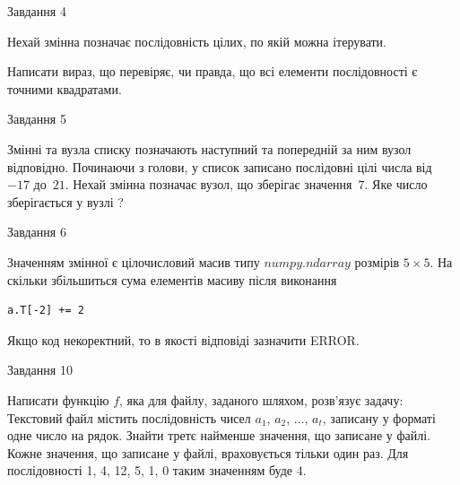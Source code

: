\documentclass[12pt, ukrainian]{article}
\begin{document}
{\begin{minipage}[t]{8.0cm}
\end{minipage}


               
{\begin{center}Завдання {4}\end{center}}
\vspace{-4mm}
Нехай змінна  позначає послідовність цілих, по якій можна ітерувати.

Написати вираз, що перевіряє, чи правда, що всі елементи послідовності є точними квадратами.\par

\vspace{10mm}
               
{\begin{center}Завдання {5}\end{center}}
\vspace{-4mm}
Змінні  та  вузла списку позначають наступний та попередній за ним вузол відповідно. Починаючи з голови, у список записано послідовні цілі числа від~$-17$ до~$21$. Нехай змінна  позначає вузол, що зберігає значення~$7$.
Яке число зберігається у вузлі  ?\par

               
{\begin{center}Завдання {6}\end{center}}
\vspace{-4mm}
Значенням змінної  є цілочисловий масив типу $numpy.ndarray$ розмірів $5{\times}5$. На скільки збільшиться сума елементів масиву  після виконання
\begin{verbatim}
a.T[-2] += 2
\end{verbatim}


Якщо код некоректний, то в якості відповіді зазначити ERROR.\par

               
{\begin{center}Завдання {10}\end{center}}
\vspace{-4mm}

Написати функцію $f$, яка для файлу, заданого шляхом, розв’язує задачу:\\ Текстовий файл містить послідовність чисел $a_1$, $a_2$, $\ldots$, $a_t$, записану у форматі одне число на рядок. Знайти третє найменше значення, що записане у файлі. Кожне значення, що записане у файлі, враховується тільки один раз. Для послідовності 1, 4, 12, 5, 1, 0 таким значенням буде 4.

}
\end{document}
